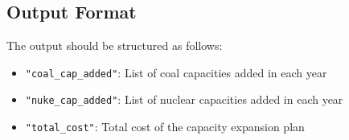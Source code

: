\documentclass{article}
\begin{document}
\subsection*{Output Format}
The output should be structured as follows:
\begin{itemize}
    \item \texttt{"coal\_cap\_added"}: List of coal capacities added in each year
    \item \texttt{"nuke\_cap\_added"}: List of nuclear capacities added in each year
    \item \texttt{"total\_cost"}: Total cost of the capacity expansion plan
\end{itemize}
\end{document}
